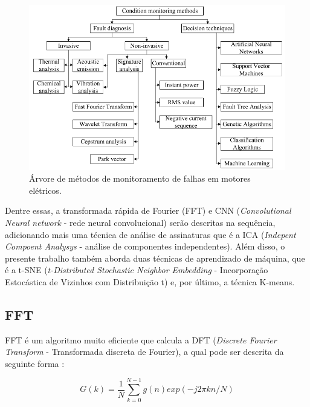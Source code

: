 \begin{figure}[H]
    \caption{Árvore de métodos de monitoramento de falhas em motores elétricos.}
    \begin{center}
        \includegraphics[scale=.5]{referencial/img/monitoring_methods_rilski_p78.png}
    \end{center}
    \label{fig:monitoring_methods_rilski_p78}
\end{figure}

Dentre essas, a transformada rápida de Fourier (FFT) e CNN (\textit{Convolutional Neural network} - rede neural convolucional) 
serão descritas na sequência, adicionando mais uma técnica de análise de assinaturas que é a ICA (\textit{Indepent Compoent Analysys}
 - análise de componentes independentes). Além disso, o presente trabalho também aborda duas técnicas de aprendizado de máquina, que 
 é a t-SNE (\textit{t-Distributed Stochastic Neighbor Embedding} - Incorporação Estocástica de Vizinhos com Distribuição t) e, por último, 
 a técnica K-means.


% 

\subsection{FFT}

FFT é um algoritmo muito eficiente que calcula a DFT (\textit{Discrete Fourier Transform} - Transformada discreta de Fourier), a qual 
pode ser descrita da seguinte forma \cite{Wu2013}:

\begin{equation}\label{eq:dft}
    G(k)=\frac{1}{N}\sum_{k=0}^{N-1} g(n)exp(-j2\pi kn/N)
\end{equation}

